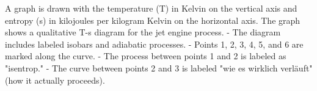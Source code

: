 A graph is drawn with the temperature (T) in Kelvin on the vertical axis and entropy (s) in kilojoules per kilogram Kelvin on the horizontal axis. The graph shows a qualitative T-s diagram for the jet engine process.  
- The diagram includes labeled isobars and adiabatic processes.  
- Points 1, 2, 3, 4, 5, and 6 are marked along the curve.  
- The process between points 1 and 2 is labeled as "isentrop."  
- The curve between points 2 and 3 is labeled "wie es wirklich verläuft" (how it actually proceeds).